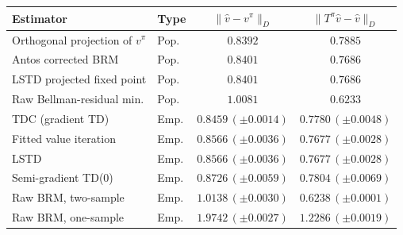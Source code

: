 \begin{tabular}{llcc}
\toprule
Estimator & Type & $\|\hat v - v^\pi\|_D$ & $\|T^\pi\hat v - \hat v\|_D$\\
\midrule
Orthogonal projection of $v^\pi$ & Pop. & $0.8392$ & $0.7885$\\
Antos corrected BRM & Pop. & $0.8401$ & $0.7686$\\
LSTD projected fixed point & Pop. & $0.8401$ & $0.7686$\\
Raw Bellman-residual min. & Pop. & $1.0081$ & $0.6233$\\
\midrule
TDC (gradient TD) & Emp. & $0.8459\,(\pm0.0014)$ & $0.7780\,(\pm0.0048)$\\
Fitted value iteration & Emp. & $0.8566\,(\pm0.0036)$ & $0.7677\,(\pm0.0028)$\\
LSTD & Emp. & $0.8566\,(\pm0.0036)$ & $0.7677\,(\pm0.0028)$\\
Semi-gradient TD(0) & Emp. & $0.8726\,(\pm0.0059)$ & $0.7804\,(\pm0.0069)$\\
Raw BRM, two-sample & Emp. & $1.0138\,(\pm0.0030)$ & $0.6238\,(\pm0.0001)$\\
Raw BRM, one-sample & Emp. & $1.9742\,(\pm0.0027)$ & $1.2286\,(\pm0.0019)$\\
\bottomrule
\end{tabular}
